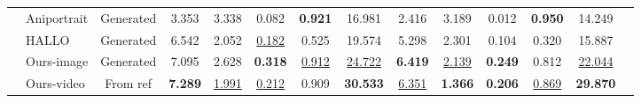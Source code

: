 \documentclass[conference]{IEEEtran}
\begin{document}
\begin{table}[t!]
{\begin{tabular}{llcccccc|cccccc}
      & Aniportrait \cite{aniportrait} & Generated & 3.353 & 3.338 & 0.082 & \textbf{0.921} & 16.981 & 2.416 & 3.189 & 0.012 & \textbf{0.950} & 14.249 \\
      & HALLO \cite{hallo} & Generated & 6.542 & 2.052 & \underline{0.182} & 0.525 & 19.574 & 5.298 & 2.301 & 0.104 & 0.320 & 15.887 \\
      \multicolumn{1}{l}{\multirow{2}{*}{}} &
      \multicolumn{1}{l}{\cellcolor[gray]{0.95}Ours-image} & \cellcolor[gray]{0.95}Generated & \cellcolor[gray]{0.95}7.095 & \cellcolor[gray]{0.95}2.628 & \cellcolor[gray]{0.95}\textbf{0.318} & \cellcolor[gray]{0.95}\underline{0.912} & \cellcolor[gray]{0.95}\underline{24.722} & \cellcolor[gray]{0.95}\textbf{6.419} & \cellcolor[gray]{0.95}\underline{2.139} & \cellcolor[gray]{0.95}\textbf{0.249} & \cellcolor[gray]{0.95}0.812 & \cellcolor[gray]{0.95}\underline{22.044} \\
      \multicolumn{1}{l}{} &
      \multicolumn{1}{l}{\cellcolor[gray]{0.95}Ours-video} & \cellcolor[gray]{0.95}From ref & \cellcolor[gray]{0.95}\textbf{7.289} & \cellcolor[gray]{0.95}\underline{1.991} & \cellcolor[gray]{0.95}\underline{0.212} & \cellcolor[gray]{0.95}0.909 & \cellcolor[gray]{0.95}\textbf{30.533} & \cellcolor[gray]{0.95}\underline{6.351} & \cellcolor[gray]{0.95}\textbf{1.366} & \cellcolor[gray]{0.95}\textbf{0.206} & \cellcolor[gray]{0.95}\underline{0.869} & \cellcolor[gray]{0.95}\textbf{29.870} \\
      \bottomrule
    \end{tabular}%
    }
  \label{tab:comparison}
\end{table}
\end{document}

